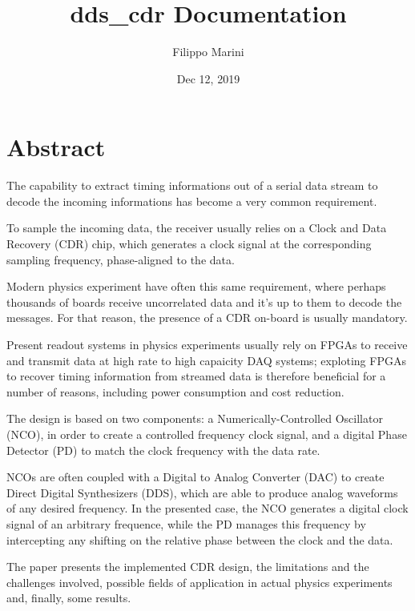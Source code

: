 \documentclass[letterpaper,10pt,english,openany,oneside]{sphinxmanual}
\title{dds\_cdr Documentation}
\date{Dec 12, 2019}
\author{Filippo Marini}
\begin{document}
\pagestyle{empty}
\sphinxmaketitle
\pagestyle{plain}
\sphinxtableofcontents
\pagestyle{normal}
\label{\detokenize{index::doc}}



\chapter{Abstract}
\label{\detokenize{paper/abstract:abstract}}\label{\detokenize{paper/abstract::doc}}
\begin{DUlineblock}{0em}
\item[] The capability to extract timing informations out of a serial data stream to decode the incoming informations has become a very common requirement.
\item[] To sample the incoming data, the receiver usually relies on a Clock and Data Recovery (CDR) chip, which generates a clock signal at the corresponding sampling frequency, phase-aligned to the data.
\end{DUlineblock}

Modern physics experiment have often this same requirement, where perhaps thousands of boards receive uncorrelated data and it’s up to them to decode the messages. For that reason, the presence of a CDR on-board is usually mandatory.

Present readout systems in physics experiments usually rely on FPGAs to receive and transmit data at high rate to high capaicity DAQ systems; exploting FPGAs to recover timing information from streamed data is therefore beneficial for a number of reasons, including power consumption and cost reduction.

\begin{DUlineblock}{0em}
\item[] The design is based on two components: a Numerically-Controlled Oscillator (NCO), in order to create a controlled frequency clock signal, and a digital Phase Detector (PD) to match the clock frequency with the data rate.
\item[] NCOs are often coupled with a Digital to Analog Converter (DAC) to create Direct Digital Synthesizers (DDS), which are able to produce analog waveforms of any desired frequency. In the presented case, the NCO generates a digital clock signal of an arbitrary frequence, while the PD manages this frequency by intercepting any shifting on the relative phase between the clock and the data.
\end{DUlineblock}

The paper presents the implemented CDR design, the limitations and the challenges involved, possible fields of application in actual physics experiments and, finally, some results.
\end{document}
